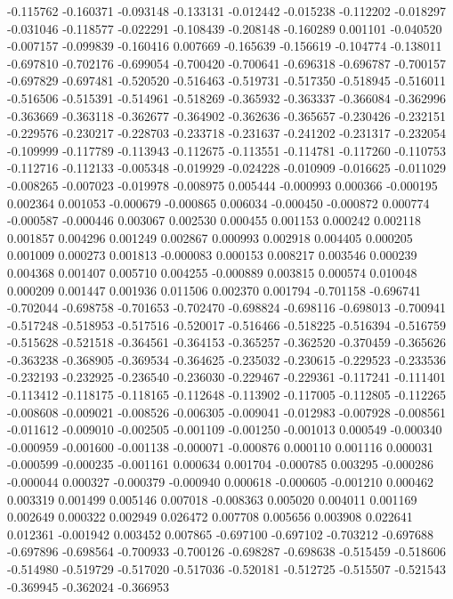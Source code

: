 -0.115762
-0.160371
-0.093148
-0.133131
-0.012442
-0.015238
-0.112202
-0.018297
-0.031046
-0.118577
-0.022291
-0.108439
-0.208148
-0.160289
0.001101
-0.040520
-0.007157
-0.099839
-0.160416
0.007669
-0.165639
-0.156619
-0.104774
-0.138011
-0.697810
-0.702176
-0.699054
-0.700420
-0.700641
-0.696318
-0.696787
-0.700157
-0.697829
-0.697481
-0.520520
-0.516463
-0.519731
-0.517350
-0.518945
-0.516011
-0.516506
-0.515391
-0.514961
-0.518269
-0.365932
-0.363337
-0.366084
-0.362996
-0.363669
-0.363118
-0.362677
-0.364902
-0.362636
-0.365657
-0.230426
-0.232151
-0.229576
-0.230217
-0.228703
-0.233718
-0.231637
-0.241202
-0.231317
-0.232054
-0.109999
-0.117789
-0.113943
-0.112675
-0.113551
-0.114781
-0.117260
-0.110753
-0.112716
-0.112133
-0.005348
-0.019929
-0.024228
-0.010909
-0.016625
-0.011029
-0.008265
-0.007023
-0.019978
-0.008975
0.005444
-0.000993
0.000366
-0.000195
0.002364
0.001053
-0.000679
-0.000865
0.006034
-0.000450
-0.000872
0.000774
-0.000587
-0.000446
0.003067
0.002530
0.000455
0.001153
0.000242
0.002118
0.001857
0.004296
0.001249
0.002867
0.000993
0.002918
0.004405
0.000205
0.001009
0.000273
0.001813
-0.000083
0.000153
0.008217
0.003546
0.000239
0.004368
0.001407
0.005710
0.004255
-0.000889
0.003815
0.000574
0.010048
0.000209
0.001447
0.001936
0.011506
0.002370
0.001794
-0.701158
-0.696741
-0.702044
-0.698758
-0.701653
-0.702470
-0.698824
-0.698116
-0.698013
-0.700941
-0.517248
-0.518953
-0.517516
-0.520017
-0.516466
-0.518225
-0.516394
-0.516759
-0.515628
-0.521518
-0.364561
-0.364153
-0.365257
-0.362520
-0.370459
-0.365626
-0.363238
-0.368905
-0.369534
-0.364625
-0.235032
-0.230615
-0.229523
-0.233536
-0.232193
-0.232925
-0.236540
-0.236030
-0.229467
-0.229361
-0.117241
-0.111401
-0.113412
-0.118175
-0.118165
-0.112648
-0.113902
-0.117005
-0.112805
-0.112265
-0.008608
-0.009021
-0.008526
-0.006305
-0.009041
-0.012983
-0.007928
-0.008561
-0.011612
-0.009010
-0.002505
-0.001109
-0.001250
-0.001013
0.000549
-0.000340
-0.000959
-0.001600
-0.001138
-0.000071
-0.000876
0.000110
0.001116
0.000031
-0.000599
-0.000235
-0.001161
0.000634
0.001704
-0.000785
0.003295
-0.000286
-0.000044
0.000327
-0.000379
-0.000940
0.000618
-0.000605
-0.001210
0.000462
0.003319
0.001499
0.005146
0.007018
-0.008363
0.005020
0.004011
0.001169
0.002649
0.000322
0.002949
0.026472
0.007708
0.005656
0.003908
0.022641
0.012361
-0.001942
0.003452
0.007865
-0.697100
-0.697102
-0.703212
-0.697688
-0.697896
-0.698564
-0.700933
-0.700126
-0.698287
-0.698638
-0.515459
-0.518606
-0.514980
-0.519729
-0.517020
-0.517036
-0.520181
-0.512725
-0.515507
-0.521543
-0.369945
-0.362024
-0.366953
